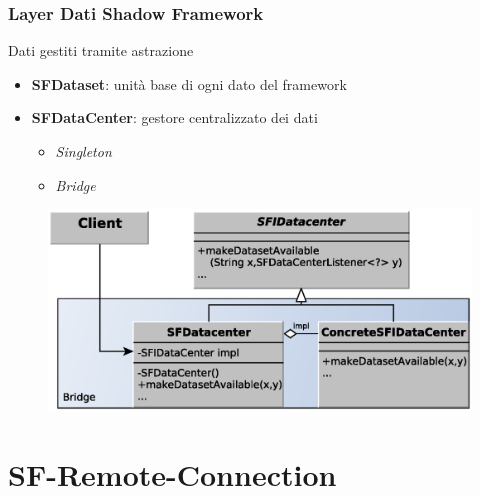 \documentclass[ignorenonframetext,8pt]{beamer}
\begin{document}
	\begin{frame}
		\frametitle{Layer Dati Shadow Framework}
		\begin{block}{Dati gestiti tramite astrazione}
			\begin{itemize}
				\item \textbf{SFDataset}: unit\`a base di ogni dato del framework
				\item \textbf{SFDataCenter}: gestore centralizzato dei dati
					\begin{itemize}
						\item \textit{Singleton}
						\item \textit{Bridge}
					\end{itemize}
			\end{itemize}
			\begin{figure}
				\includegraphics[width=.70\textwidth]{Immagini/DataCenter}
			\end{figure}
		\end{block}
	\end{frame}

	\section{SF-Remote-Connection}
\end{document}
